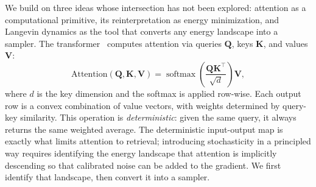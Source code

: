 
We build on three ideas whose intersection has not been explored: attention as a computational primitive, its reinterpretation as energy minimization, and Langevin dynamics as the tool that converts any energy landscape into a sampler. The transformer~\cite{vaswaniAttentionAllYou2017} computes attention via queries $\mathbf{Q}$, keys $\mathbf{K}$, and values $\mathbf{V}$:
\begin{equation}\label{eq:sdp-attention}
    \mathrm{Attention}(\mathbf{Q},\mathbf{K},\mathbf{V})
    = \operatorname{softmax}\!\left(\frac{\mathbf{Q}\mathbf{K}^{\top}}{\sqrt{d}}\right)\mathbf{V},
\end{equation}
where $d$ is the key dimension and the softmax is applied row-wise. Each output row is a convex combination of value vectors, with weights determined by query-key similarity. This operation is \emph{deterministic}: given the same query, it always returns the same weighted average. The deterministic input-output map is exactly what limits attention to retrieval; introducing stochasticity in a principled way requires identifying the energy landscape that attention is implicitly descending so that calibrated noise can be added to the gradient. We first identify that landscape, then convert it into a sampler.

